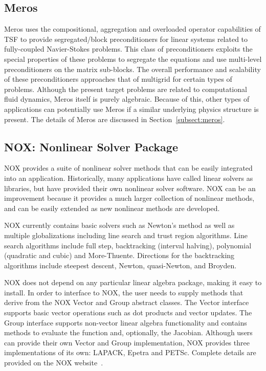 \documentclass[12pt,relax]{TPA}
\begin{document}
\subsection{Meros}

Meros uses the compositional, aggregation and overloaded operator capabilities of
TSF to provide segregated/block preconditioners for linear systems
related to fully-coupled Navier-Stokes problems.  This class of
preconditioners exploits the special properties of these problems to
segregate the equations and use multi-level preconditioners on the
matrix sub-blocks.  The overall performance and scalability of these
preconditioners approaches that of multigrid for certain types of
problems.  Although the present target problems are related to
computational fluid dynamics, Meros itself is purely algebraic.
Because of this, other types of applications can potentially use Meros
if a similar underlying physics structure is present.  The details of
Meros are discussed in Section~\ref{subsect:meros}.


\subsection{NOX: Nonlinear Solver Package}

NOX provides a suite of nonlinear solver methods that can be easily
integrated into an application.  Historically, many applications have
called linear solvers as libraries, but have provided their own
nonlinear solver software.  NOX can be an improvement because it
provides a much larger collection of nonlinear methods, and can be
easily extended as new nonlinear methods are developed.

NOX currently contains basic solvers such as Newton's method as well
as multiple globalizations including line search and trust
region algorithms. Line search algorithms include full step,
backtracking (interval halving), polynomial (quadratic and cubic) and
More-Thuente.  Directions for the backtracking algorithms include
steepest descent, Newton, quasi-Newton, and Broyden.

NOX does not depend on any particular linear algebra package, making
it easy to install. In order to interface to NOX, the user needs to
supply methods that derive from the NOX Vector and Group abstract
classes.  The Vector interface supports basic vector operations such
as dot products and vector updates. The Group interface supports
non-vector linear algebra functionality and contains methods to
evaluate the function and, optionally, the Jacobian.  
Although users can provide their own Vector and Group implementation,
NOX provides three implementations of its own: LAPACK, Epetra and
PETSc.  Complete details
are provided on the NOX website~\cite{NOX-home-page}.
\end{document}
